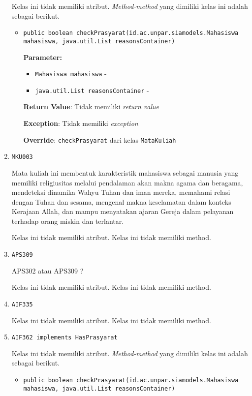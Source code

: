\documentclass{article}
\begin{document}
\begin{enumerate}
Kelas ini tidak memiliki atribut. \textit{Method-method} yang dimiliki kelas ini adalah sebagai berikut.
\begin{itemize}
\item \texttt{public boolean checkPrasyarat(id.ac.unpar.siamodels.Mahasiswa mahasiswa, java.util.List reasonsContainer)}



\textbf{Parameter:}
\begin{itemize}
\item \texttt{Mahasiswa mahasiswa} - 
\item \texttt{java.util.List reasonsContainer} - 
\end{itemize}
\textbf{Return Value}: Tidak memiliki \textit{return value}

\textbf{Exception}: Tidak memiliki \textit{exception}

\textbf{Override}: \texttt{checkPrasyarat} dari kelas \texttt{MataKuliah}

\end{itemize}
\item \texttt{MKU003}

Mata kuliah ini membentuk karakteristik mahasiswa sebagai manusia yang memiliki religiusitas
 melalui pendalaman akan makna agama dan beragama, mendeteksi dinamika Wahyu Tuhan dan iman 
 mereka, memahami relasi dengan Tuhan dan sesama, mengenal makna keselamatan dalam konteks 
 Kerajaan Allah, dan mampu menyatakan ajaran Gereja dalam pelayanan terhadap orang miskin dan
 terlantar.

Kelas ini tidak memiliki atribut. Kelas ini tidak memiliki method. \item \texttt{APS309}

APS302 atau APS309 ?

Kelas ini tidak memiliki atribut. Kelas ini tidak memiliki method. \item \texttt{AIF335}



Kelas ini tidak memiliki atribut. Kelas ini tidak memiliki method. \item \texttt{AIF362 implements HasPrasyarat}



Kelas ini tidak memiliki atribut. \textit{Method-method} yang dimiliki kelas ini adalah sebagai berikut.
\begin{itemize}
\item \texttt{public boolean checkPrasyarat(id.ac.unpar.siamodels.Mahasiswa mahasiswa, java.util.List reasonsContainer)}




\end{itemize}
\end{enumerate}
\end{document}
